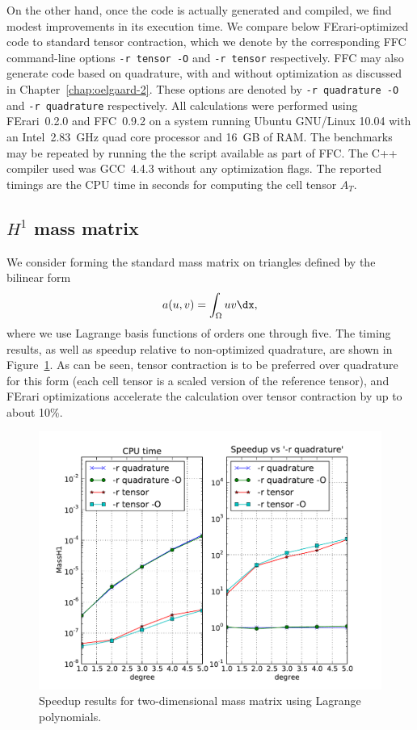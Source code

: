 On the other hand, once the code is actually generated and compiled,
we find modest improvements in its execution time. We compare below
FErari-optimized code to standard tensor contraction, which we denote
by the corresponding FFC command-line options \texttt{-r tensor -O}
and \texttt{-r tensor} respectively. FFC may also generate code based
on quadrature, with and without optimization as discussed in
Chapter~\ref{chap:oelgaard-2}. These options are denoted by \texttt{-r
  quadrature -O} and \texttt{-r quadrature} respectively. All
calculations were performed using FErari~0.2.0 and FFC~0.9.2 on a
system running Ubuntu GNU/Linux 10.04 with an Intel~2.83~GHz quad core
processor and 16~GB of RAM. The benchmarks may be repeated by running
the the script  available as part of FFC. The C++
compiler used was GCC~4.4.3 without any optimization flags. The
reported timings are the CPU time in seconds for computing the cell
tensor $A_T$.

\subsection{$H^1$ mass matrix}

We consider forming the standard mass matrix on triangles defined by
the bilinear form
\begin{equation} \label{eq:MassH1}
  a(u, v) = \int_{\Omega} u v \dx,
\end{equation}
where we use Lagrange basis functions of orders one through five. The
timing results, as well as speedup relative to non-optimized quadrature,
are shown in Figure~\ref{fig:MassH1}. As can be seen, tensor
contraction is to be preferred over quadrature for this form (each
cell tensor is a scaled version of the reference tensor), and FErari
optimizations accelerate the calculation over tensor contraction by up
to about 10\%.

\begin{figure}
  \begin{center}
    \includegraphics[width=12cm]{chapters/kirby-3/pdf/MassH1.pdf}
    \caption{Speedup results for two-dimensional mass matrix using Lagrange polynomials.}
    \label{fig:MassH1}
  \end{center}
\end{figure}

